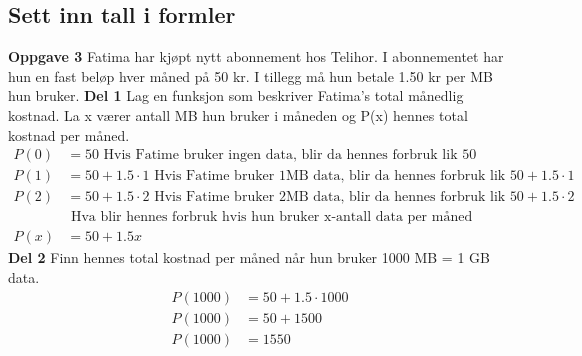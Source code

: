 \documentclass[12pt,twoside,onecolumn]{article}
\begin{document}
\subsection*{Sett inn tall i formler}
\textbf{Oppgave 3}
Fatima har kjøpt nytt abonnement hos Telihor. I abonnementet har hun en fast beløp hver måned på 50 kr. I tillegg må hun betale 1.50 kr per MB hun bruker. 
\newline
\textbf{Del 1} Lag en funksjon som beskriver Fatima's total månedlig kostnad. La x værer antall MB hun bruker i måneden og P(x) hennes total kostnad per måned.
\begin{align}
P(0) &= 50 \text{ Hvis Fatime bruker ingen data, blir da hennes forbruk lik 50}\\ 
P(1) &= 50 + 1.5\cdot1\text{ Hvis Fatime bruker 1MB data, blir da hennes forbruk lik $50 + 1.5\cdot1$}\\ 
P(2) &= 50 + 1.5\cdot2\text{ Hvis Fatime bruker 2MB data, blir da hennes forbruk lik $50 + 1.5\cdot2$}\\ 
&\text{ Hva blir hennes forbruk hvis hun bruker x-antall data per måned} \nonumber\\
P(x) &= 50 + 1.5x
\end{align}
\newline
\textbf{Del 2}
Finn hennes total kostnad per måned når hun bruker 1000 MB = 1 GB data.
\begin{align}
P(1000) &= 50 + 1.5\cdot1000\\
P(1000) &= 50 + 1500\\
P(1000) &= 1550
\end{align}
\end{document}
